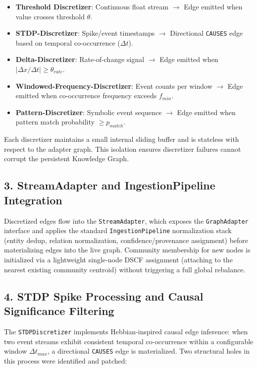\begin{itemize}
  \item \textbf{Threshold Discretizer}: Continuous float stream $\to$ Edge emitted when value crosses threshold $\theta$.
  \item \textbf{STDP-Discretizer}: Spike/event timestamps $\to$ Directional \texttt{CAUSES} edge based on temporal co-occurrence ($\Delta t$).
  \item \textbf{Delta-Discretizer}: Rate-of-change signal $\to$ Edge emitted when $|\Delta x / \Delta t| \geq \theta_{rate}$.
  \item \textbf{Windowed-Frequency-Discretizer}: Event counts per window $\to$ Edge emitted when co-occurrence frequency exceeds $f_{min}$.
  \item \textbf{Pattern-Discretizer}: Symbolic event sequence $\to$ Edge emitted when pattern match probability $\geq p_{match}$.
\end{itemize}


Each discretizer maintains a small internal sliding buffer and is stateless with respect to the adapter graph. This isolation ensures discretizer failures cannot corrupt the persistent Knowledge Graph.

\subsection*{3. StreamAdapter and IngestionPipeline Integration}
Discretized edges flow into the \texttt{StreamAdapter}, which exposes the \texttt{GraphAdapter} interface and applies the standard \texttt{IngestionPipeline} normalization stack (entity dedup, relation normalization, confidence/provenance assignment) before materializing edges into the live graph. Community membership for new nodes is initialized via a lightweight single-node DSCF assignment (attaching to the nearest existing community centroid) without triggering a full global rebalance.

\subsection*{4. STDP Spike Processing and Causal Significance Filtering}
The \texttt{STDPDiscretizer} implements Hebbian-inspired causal edge inference: when two event streams exhibit consistent temporal co-occurrence within a configurable window $\Delta t_{max}$, a directional \texttt{CAUSES} edge is materialized. Two structural holes in this process were identified and patched:

